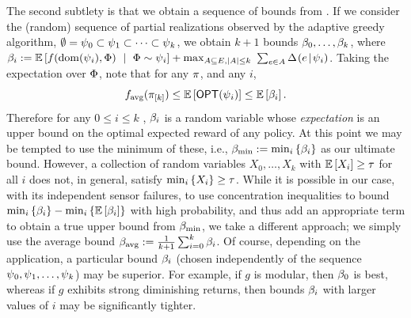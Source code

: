 The second subtlety is that we obtain a sequence of bounds from
.
If we consider the (random) sequence of partial realizations observed by the adaptive
greedy algorithm, $\emptyset = \prlz_0 \subset \prlz_1 \subset \cdots
\subset \prlz_k$, we obtain $k+1$ bounds $\bound_0, \ldots,
\bound_{k}$, where 
$\bound_{i} :=  \expct{f(\dom(\prlz_i), \rvrlz) \ \mid \ \rvrlz \sim
   \prlz_i} + \max_{A \subseteq \groundset, |A| \le
  k} \ \sum_{e \in A} \diff{\prlz_i}{e}$.
Taking the expectation over $\rvrlz$, note that for any $\policy$, and
any $i$, 
$$\avgf(\prune{\policy}{k}) \le \expct{\OPT(\prlz_i)} \le \expct{\bound_i}.$$
Therefore for any $0 \le i \le k$ , $\bound_i$ is a random variable
whose \emph{expectation} is an upper bound on the optimal expected reward of
any policy.  At this point we may be tempted to use the minimum of
these, i.e., $\bound_{\min} := \min_i \set{\bound_i}$ as our ultimate bound.
However, a collection of random variables $X_0, \ldots, X_k$ with
$\expct{X_i} \ge \tau$ for all $i$ does not, in general, satisfy 
$\min_i \set{X_i} \ge \tau$.  While it is possible in our case, with its
independent sensor failures, to use concentration inequalities to bound 
$\min_i \set{\bound_i} - \min_i \set{\expct{\bound_i}}$ with high
probability, and thus add an appropriate term to obtain a true upper
bound from $\bound_{\min}$, we take a different approach;
we simply use the average bound 
$\avgbound := \frac{1}{k+1}\sum_{i=0}^{k} \bound_i$.
Of course, depending on the application, a particular bound $\bound_i$
(chosen independently of the sequence $ \prlz_0, \prlz_1, \ldots,
\prlz_k$) may be superior.
For example, if $g$ is modular, then $\bound_0$ is best, whereas if
$g$ exhibits strong diminishing returns, then bounds $\bound_i$ with
larger values of $i$ may be significantly tighter.



\newcommand{\figwidth}{0.40\textwidth}
\newcommand{\figheightA}{0.22\textwidth}
\newcommand{\figheightB}{0.24\textwidth}


